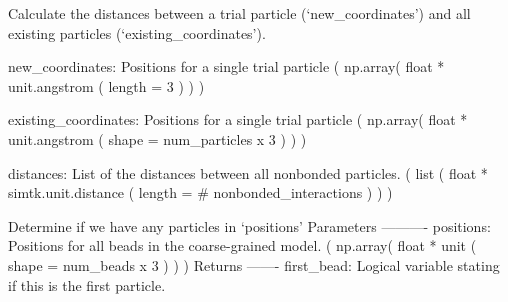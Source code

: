 \documentclass[letterpaper,12pt,english,openany,oneside]{sphinxmanual}
\begin{document}

\begin{fulllineitems}
\label{\detokenize{utilities:utilities.util.distances}}
Calculate the distances between a trial particle (‘new\_coordinates’)
and all existing particles (‘existing\_coordinates’).

new\_coordinates: Positions for a single trial particle
( np.array( float * unit.angstrom ( length = 3 ) ) )

existing\_coordinates: Positions for a single trial particle
( np.array( float * unit.angstrom ( shape = num\_particles x 3 ) ) )

distances: List of the distances between all nonbonded particles.
( list ( float * simtk.unit.distance ( length = \# nonbonded\_interactions ) ) )

\end{fulllineitems}


\begin{fulllineitems}
\label{\detokenize{utilities:utilities.util.first_bead}}
Determine if we have any particles in ‘positions’
Parameters
———-
positions: Positions for all beads in the coarse-grained model.
( np.array( float * unit ( shape = num\_beads x 3 ) ) )
Returns
——-
first\_bead: Logical variable stating if this is the first particle.

\end{fulllineitems}

\end{document}
